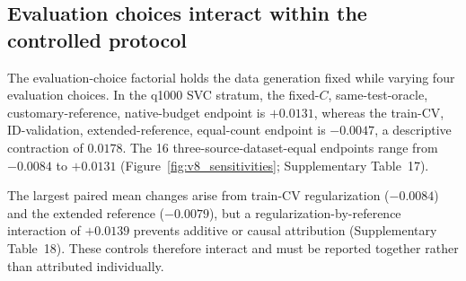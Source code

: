 \documentclass[referee,lineno,pdflatex,sn-vancouver-num]{sn-jnl}
\theoremstyle{thmstyleone}%
\theoremstyle{thmstyletwo}%
\theoremstyle{thmstylethree}%
\begin{document}
\begin{table}[t]
\centering
\caption{Logical circuit audit for the four quantum feature maps. Depth and CX columns give the values at 4 and 12 qubits after Qiskit 2.3.1 decomposition to \texttt{rz}, \texttt{sx}, \texttt{x}, and \texttt{cx}, optimization level 0, without device routing. ``Fidelity CX'' counts the compute--uncompute template for one kernel entry. Complete values at all five dimensions and one-qubit gate counts are provided in Supplementary Table~20 and the machine-readable artifact. These logical counts are not hardware-execution estimates.}
\label{tab:circuits}
\scriptsize
\setlength{\tabcolsep}{4pt}
\end{table}

\subsection{Evaluation choices interact within the controlled protocol}
\label{sec:res_v8_factorial}

The evaluation-choice factorial holds the data generation fixed while varying four evaluation choices. In the q1000 SVC stratum, the fixed-$C$, same-test-oracle, customary-reference, native-budget endpoint is $+0.0131$, whereas the train-CV, ID-validation, extended-reference, equal-count endpoint is $-0.0047$, a descriptive contraction of $0.0178$. The 16 three-source-dataset-equal endpoints range from $-0.0084$ to $+0.0131$ (Figure~\ref{fig:v8_sensitivities}; Supplementary Table~17).

The largest paired mean changes arise from train-CV regularization ($-0.0084$) and the extended reference ($-0.0079$), but a regularization-by-reference interaction of $+0.0139$ prevents additive or causal attribution (Supplementary Table~18). These controls therefore interact and must be reported together rather than attributed individually.
\end{document}
